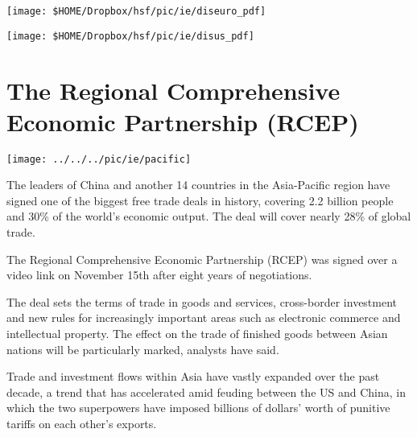 \begin{center}
	\texttt{[image: \$HOME/Dropbox/hsf/pic/ie/diseuro\_pdf]}
	\label{fig:diseuro}\bigskip
\end{center}

\begin{center}
	\texttt{[image: \$HOME/Dropbox/hsf/pic/ie/disus\_pdf]}
	\label{fig:disus}\bigskip
\end{center}


\pbn
\section{The Regional Comprehensive Economic Partnership (RCEP)}
\begin{center}
	\texttt{[image: ../../../pic/ie/pacific]}
\end{center}
The leaders of China and another 14 countries in the Asia-Pacific region have signed one of the biggest free trade deals in history, covering 2.2 billion people and 30\% of the world’s economic output.
The deal will cover nearly 28\% of global trade.

The Regional Comprehensive Economic Partnership (RCEP) was signed over a video link on November 15th after eight years of negotiations.

The deal sets the terms of trade in goods and services, cross-border investment and new rules for increasingly important areas such as electronic commerce and intellectual property. The effect on the trade of finished goods between Asian nations will be particularly marked, analysts have said.

Trade and investment flows within Asia have vastly expanded over the past decade, a trend that has accelerated amid feuding between the US and China, in which the two superpowers have imposed billions of dollars’ worth of punitive tariffs on each other’s exports.

